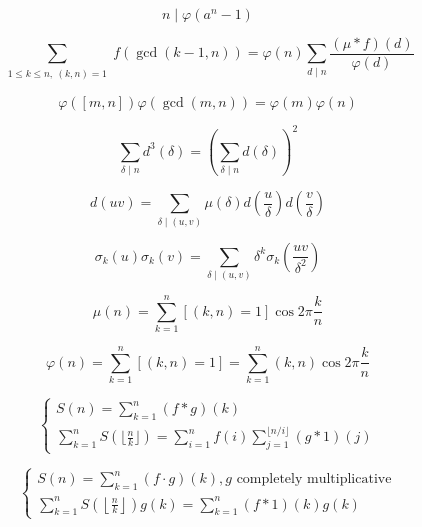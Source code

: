 \begin{equation}
    n\mid \varphi(a^n-1)
\end{equation}

\begin{equation}
    \sum_{\substack{1 \leq k \leq n,~(k, n) = 1}}f(\gcd(k-1, n)) = \varphi(n)\sum_{d\mid n}\frac{(\mu*f)(d)}{\varphi(d)}
\end{equation}

\begin{equation}
    \varphi([m, n])\varphi(\gcd(m,n)) = \varphi(m)\varphi(n)
\end{equation}

\begin{equation}
    \sum_{\delta\mid n}d^3(\delta) = \left(\sum_{\delta\mid n}d(\delta)\right)^2
\end{equation}

\begin{equation}
    d(uv) = \sum_{\delta\mid (u, v)}\mu(\delta)d\left(\frac{u}{\delta}\right)d\left(\frac{v}{\delta}\right)
\end{equation}

\begin{equation}
    \sigma_k(u)\sigma_k(v) = \sum_{\delta\mid (u, v)}\delta^k\sigma_k(\frac{uv}{\delta^2})
\end{equation}

\begin{equation}
    \mu(n) = \sum_{k=1}^n[(k, n)=1]\cos{2\pi \frac{k}{n}}
\end{equation}

\begin{equation}
    \varphi(n) = \sum_{k=1}^n[(k, n)=1] = \sum_{k=1}^n(k, n)\cos{2\pi \frac{k}{n}}
\end{equation}

\begin{equation}
    \begin{cases}
        S(n) = \sum_{k=1}^n(f * g)(k) \\
        \sum_{k=1}^nS(\lfloor \frac n k \rfloor) = \sum_{i=1}^nf(i)\sum_{j=1}^{\lfloor n/i \rfloor}(g * 1)(j)
    \end{cases}
\end{equation}

\begin{equation}
    \begin{cases}
        S(n) = \sum_{k=1}^n(f \cdot g)(k), g \text{ completely multiplicative} \\
        \sum_{k=1}^nS\left(\left\lfloor \frac n k \right\rfloor\right)g(k) = \sum_{k=1}^n(f * 1)(k)g(k)
    \end{cases}
\end{equation}

